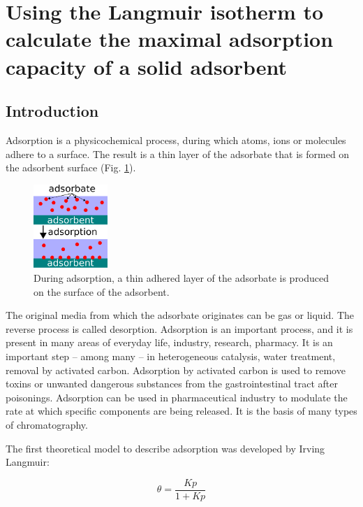 \fancyhead[LO,RE]{\thesection}
\fancyfoot[LE,RO]{\thepage}

\section{Using the Langmuir isotherm to calculate the maximal adsorption capacity of a solid adsorbent}
\subsection{Introduction}

Adsorption is a physicochemical process, during which atoms, ions or molecules adhere to a surface.
The result is a thin layer of the adsorbate that is formed on the adsorbent surface (Fig. \ref{fig:adsorption}).
\begin{figure}
\centering
\includegraphics[width=0.25\textwidth]{fig/adsorption.eps}
\caption{During adsorption, a thin adhered layer of the adsorbate is produced on the surface of the adsorbent.}
\label{fig:adsorption}
\end{figure}
The original media from which the adsorbate originates can be gas or liquid.
The reverse process is called desorption.
Adsorption is an important process, and it is present in many areas of everyday life, industry, research, pharmacy.
It is an important step -- among many -- in heterogeneous catalysis, water treatment, removal by activated carbon.
Adsorption by activated carbon is used to remove toxins or unwanted dangerous substances from the gastrointestinal tract after poisonings.
Adsorption can be used in pharmaceutical industry to modulate the rate at which specific components are being released. 
It is the basis of many types of chromatography.

The first theoretical model to describe adsorption was developed by Irving Langmuir:

\begin{equation}
\label{eq:langmuir1}
        \theta
        =
        \frac
                {K p}
                {1 + K p} 
\end{equation}


